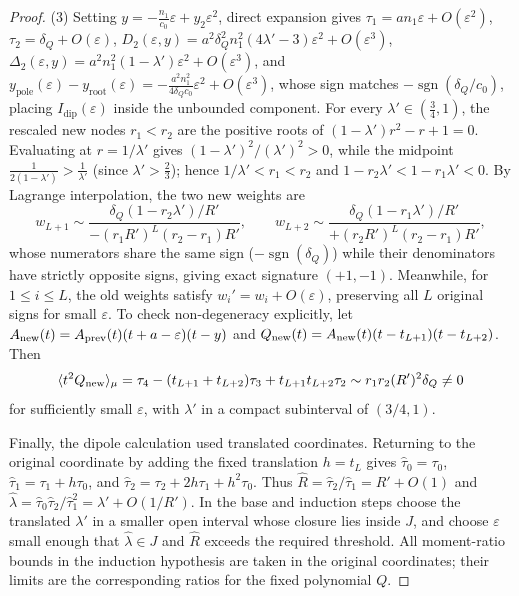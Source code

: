 \documentclass[11pt,a4paper]{article}
\theoremstyle{definition}
\theoremstyle{remark}
\begin{document}
\begin{proof}
(3) Setting $y = -\frac{n_1}{c_0} \varepsilon + y_2 \varepsilon^2$, direct expansion gives $\tau_1 = a n_1 \varepsilon + O(\varepsilon^2)$, $\tau_2 = \delta_Q + O(\varepsilon)$, $D_2(\varepsilon, y) = a^2 \delta_Q^2 n_1^2 (4\lambda' - 3)\varepsilon^2 + O(\varepsilon^3)$, $\Delta_2(\varepsilon, y) = a^2 n_1^2 (1 - \lambda')\varepsilon^2 + O(\varepsilon^3)$, and $y_{\mathrm{pole}}(\varepsilon) - y_{\mathrm{root}}(\varepsilon) = -\frac{a^2 n_1^2}{4 \delta_Q c_0}\varepsilon^2 + O(\varepsilon^3)$, whose sign matches $-\operatorname{sgn}(\delta_Q / c_0)$, placing $I_{\mathrm{dip}}(\varepsilon)$ inside the unbounded component. For every $\lambda' \in (\frac{3}{4}, 1)$, the rescaled new nodes $r_1 < r_2$ are the positive roots of $(1 - \lambda')r^2 - r + 1 = 0$. Evaluating at $r = 1/\lambda'$ gives $(1 - \lambda')^2/(\lambda')^2 > 0$, while the midpoint $\frac{1}{2(1 - \lambda')} > \frac{1}{\lambda'}$ (since $\lambda' > \frac{2}{3}$); hence $1/\lambda' < r_1 < r_2$ and $1 - r_2 \lambda' < 1 - r_1 \lambda' < 0$. By Lagrange interpolation, the two new weights are
\[
w_{L+1} \sim \frac{\delta_Q (1 - r_2 \lambda') / R'}{-(r_1 R')^L (r_2 - r_1) R'}, \qquad
w_{L+2} \sim \frac{\delta_Q (1 - r_1 \lambda') / R'}{+(r_2 R')^L (r_2 - r_1) R'},
\]
whose numerators share the same sign ($-\operatorname{sgn}(\delta_Q)$) while their denominators have strictly opposite signs, giving exact signature $(+1, -1)$. Meanwhile, for $1 \le i \le L$, the old weights satisfy $w_i' = w_i + O(\varepsilon)$, preserving all $L$ original signs for small $\varepsilon$. To check non-degeneracy explicitly, let $A_{\rm new}(t)=A_{\rm prev}(t)(t+a-\varepsilon)(t-y)$ and $Q_{\rm new}(t)=A_{\rm new}(t)(t-t_{L+1})(t-t_{L+2})$. Then
\[
\langle t^2 Q_{\rm new}\rangle_\mu
=\tau_4-(t_{L+1}+t_{L+2})\tau_3+t_{L+1}t_{L+2}\tau_2
\sim r_1r_2 (R')^2\delta_Q\ne0
\]
for sufficiently small $\varepsilon$, with $\lambda'$ in a compact subinterval of $(3/4,1)$.

Finally, the dipole calculation used translated coordinates. Returning to the original coordinate by adding the fixed translation $h=t_L$ gives $\widehat\tau_0=\tau_0$, $\widehat\tau_1=\tau_1+h\tau_0$, and $\widehat\tau_2=\tau_2+2h\tau_1+h^2\tau_0$. Thus $\widehat R=\widehat\tau_2/\widehat\tau_1=R'+O(1)$ and $\widehat\lambda=\widehat\tau_0\widehat\tau_2/\widehat\tau_1^2=\lambda'+O(1/R')$. In the base and induction steps choose the translated $\lambda'$ in a smaller open interval whose closure lies inside $J$, and choose $\varepsilon$ small enough that $\widehat\lambda\in J$ and $\widehat R$ exceeds the required threshold. All moment-ratio bounds in the induction hypothesis are taken in the original coordinates; their limits are the corresponding ratios for the fixed polynomial $Q$.
\end{proof}
\end{document}
